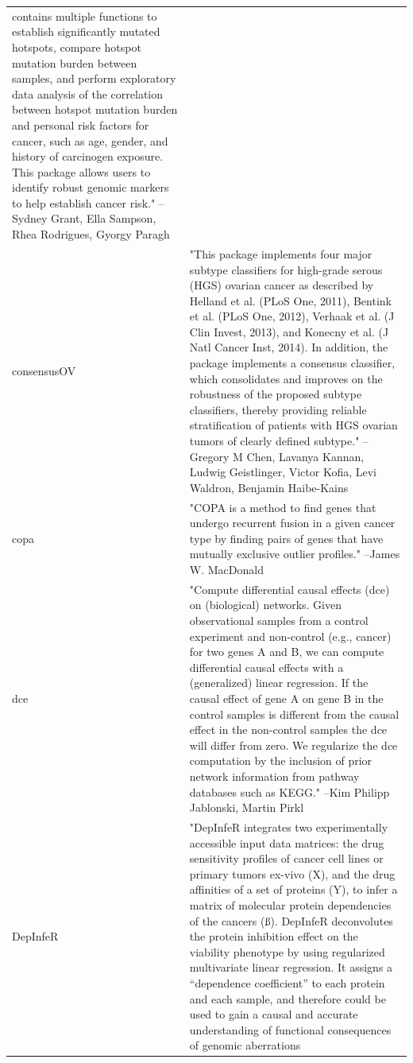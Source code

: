 \documentclass[]{article}
\begin{document}
\begin{longtable}[t]{l>{\raggedright\arraybackslash}p{25em}}
contains multiple functions to establish significantly mutated
hotspots, compare hotspot mutation burden between samples, and
perform exploratory data analysis of the correlation between
hotspot mutation burden and personal risk factors for cancer,
such as age, gender, and history of carcinogen exposure. This
package allows users to identify robust genomic markers to help
establish cancer risk." --Sydney Grant, Ella Sampson, Rhea Rodrigues, Gyorgy Paragh\\
consensusOV & "This package implements four major subtype classifiers for
high-grade serous (HGS) ovarian cancer as described by Helland
et al. (PLoS One, 2011), Bentink et al. (PLoS One, 2012),
Verhaak et al. (J Clin Invest, 2013), and Konecny et al. (J
Natl Cancer Inst, 2014). In addition, the package implements a
consensus classifier, which consolidates and improves on the
robustness of the proposed subtype classifiers, thereby
providing reliable stratification of patients with HGS ovarian
tumors of clearly defined subtype." --Gregory M Chen, Lavanya Kannan, Ludwig Geistlinger, Victor Kofia, Levi Waldron, Benjamin Haibe-Kains\\
\addlinespace
copa & "COPA is a method to find genes that undergo recurrent
fusion in a given cancer type by finding pairs of genes that
have mutually exclusive outlier profiles." --James W. MacDonald\\
dce & "Compute differential causal effects (dce) on (biological)
networks. Given observational samples from a control experiment
and non-control (e.g., cancer) for two genes A and B, we can
compute differential causal effects with a (generalized) linear
regression. If the causal effect of gene A on gene B in the
control samples is different from the causal effect in the
non-control samples the dce will differ from zero. We
regularize the dce computation by the inclusion of prior
network information from pathway databases such as KEGG." --Kim Philipp Jablonski, Martin Pirkl\\
DepInfeR & "DepInfeR integrates two experimentally accessible input
data matrices: the drug sensitivity profiles of cancer cell
lines or primary tumors ex-vivo (X), and the drug affinities of
a set of proteins (Y), to infer a matrix of molecular protein
dependencies of the cancers (ß). DepInfeR deconvolutes the
protein inhibition effect on the viability phenotype by using
regularized multivariate linear regression. It assigns a
“dependence coefficient” to each protein and each sample, and
therefore could be used to gain a causal and accurate
understanding of functional consequences of genomic aberrations

\end{longtable}
\end{document}
